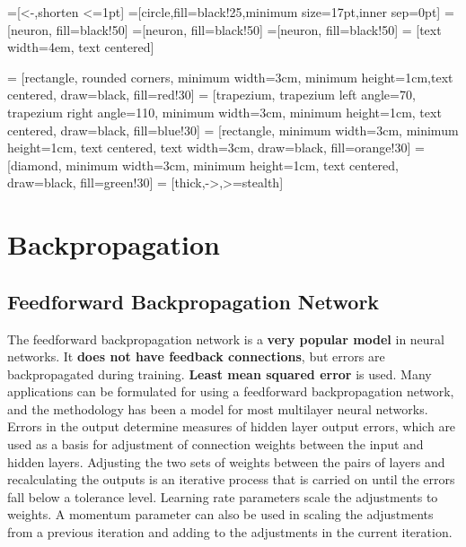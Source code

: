 \documentclass[12pt, right open]{memoir}
\begin{document}



=[<-,shorten <=1pt]
=[circle,fill=black!25,minimum size=17pt,inner sep=0pt]
=[neuron, fill=black!50]
=[neuron, fill=black!50]
=[neuron, fill=black!50]
 = [text width=4em, text centered]

 = [rectangle, rounded corners, minimum width=3cm, minimum height=1cm,text centered, draw=black, fill=red!30]
 = [trapezium, trapezium left angle=70, trapezium right angle=110, minimum width=3cm, minimum height=1cm, text centered, draw=black, fill=blue!30]
 = [rectangle, minimum width=3cm, minimum height=1cm, text centered, text width=3cm, draw=black, fill=orange!30]
 = [diamond, minimum width=3cm, minimum height=1cm, text centered, draw=black, fill=green!30]
 = [thick,->,>=stealth]


\chapter{Backpropagation}

\section{Feedforward Backpropagation Network}
The feedforward backpropagation network is a \textbf{very popular model} in neural
networks. It \textbf{does not have feedback connections}, but errors are
backpropagated during training. \textbf{Least mean squared error} is used. Many
applications can be formulated for using a feedforward backpropagation
network, and the methodology has been a model for most multilayer neural
networks. Errors in the output determine measures of hidden layer output
errors, which are used as a basis for adjustment of connection weights between
the input and hidden layers. Adjusting the two sets of weights between the
pairs of layers and recalculating the outputs is an iterative process that is
carried on until the errors fall below a tolerance level. Learning rate
parameters scale the adjustments to weights. A momentum parameter can also
be used in scaling the adjustments from a previous iteration and adding to the
adjustments in the current iteration.
\end{document}
